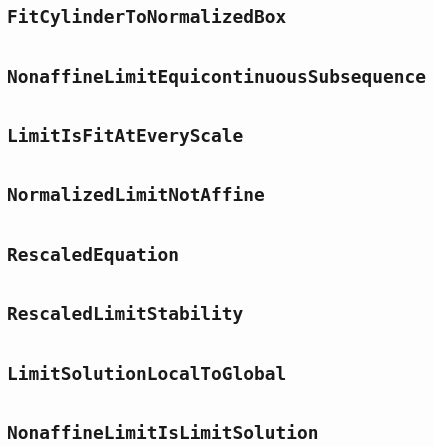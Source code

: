 \documentclass[11pt]{amsart}
\theoremstyle{definition}
\begin{document}
\subsection{\texorpdfstring{\texttt{FitCylinderToNormalizedBox}}{FitCylinderToNormalizedBox}}\label{node:FitCylinderToNormalizedBox}


\subsection{\texorpdfstring{\texttt{NonaffineLimitEquicontinuousSubsequence}}{NonaffineLimitEquicontinuousSubsequence}}\label{node:NonaffineLimitEquicontinuousSubsequence}


\subsection{\texorpdfstring{\texttt{LimitIsFitAtEveryScale}}{LimitIsFitAtEveryScale}}\label{node:LimitIsFitAtEveryScale}


\subsection{\texorpdfstring{\texttt{NormalizedLimitNotAffine}}{NormalizedLimitNotAffine}}\label{node:NormalizedLimitNotAffine}


\subsection{\texorpdfstring{\texttt{RescaledEquation}}{RescaledEquation}}\label{node:RescaledEquation}


\subsection{\texorpdfstring{\texttt{RescaledLimitStability}}{RescaledLimitStability}}\label{node:RescaledLimitStability}


\subsection{\texorpdfstring{\texttt{LimitSolutionLocalToGlobal}}{LimitSolutionLocalToGlobal}}\label{node:LimitSolutionLocalToGlobal}


\subsection{\texorpdfstring{\texttt{NonaffineLimitIsLimitSolution}}{NonaffineLimitIsLimitSolution}}\label{node:NonaffineLimitIsLimitSolution}

\end{document}
